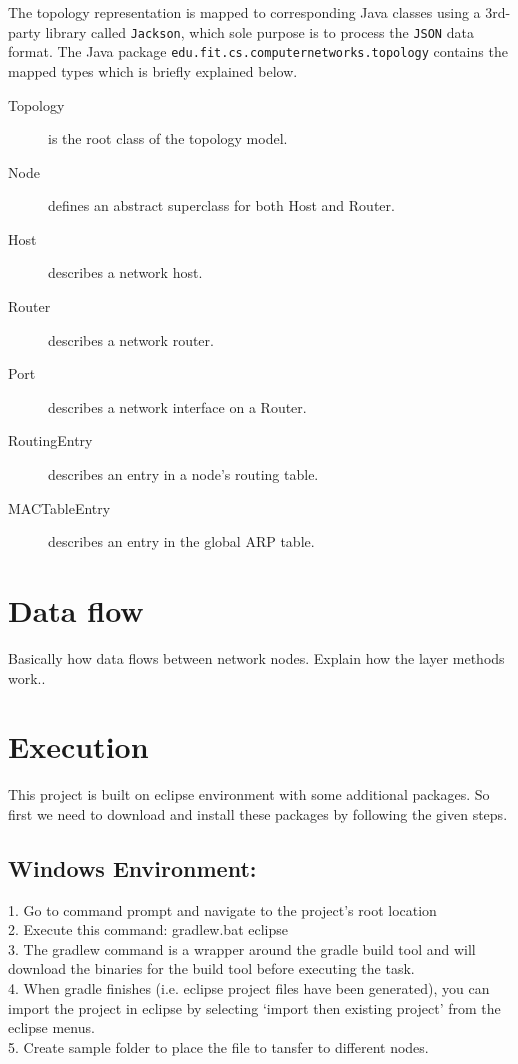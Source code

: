 \documentclass{scrartcl}
\begin{document}
The topology representation is mapped to corresponding Java classes using a 3rd-party library called \texttt{Jackson}, which sole purpose is to process the \texttt{JSON} data format. The Java package \texttt{edu.fit.cs.computernetworks.topology} contains the mapped types which is briefly explained below.

\begin{description}
\item[Topology] is the root class of the topology model.
\item[Node] defines an abstract superclass for both Host and Router.
\item[Host] describes a network host.
\item[Router] describes a network router.
\item[Port] describes a network interface on a Router.
\item[RoutingEntry] describes an entry in a node's routing table.
\item[MACTableEntry] describes an entry in the global ARP table.
\end{description}

\section{Data flow}
Basically how data flows between network nodes. Explain how the layer methods work..

\section{Execution}
This project is built on eclipse environment with some additional packages. So first we need to download and install these packages by following the given steps.
\subsection{Windows Environment:}
1. Go to command prompt and navigate to the project's root location \\
2. Execute this command: gradlew.bat eclipse \\
3. The gradlew command is a wrapper around the gradle build tool and will download the binaries for the build tool before executing the task. \\
4. When gradle finishes (i.e. eclipse project files have been generated), you can import the project in eclipse by selecting ‘import then existing project’ from the eclipse menus. \\ 
5. Create sample folder to place the file to tansfer to different nodes.
\end{document}
